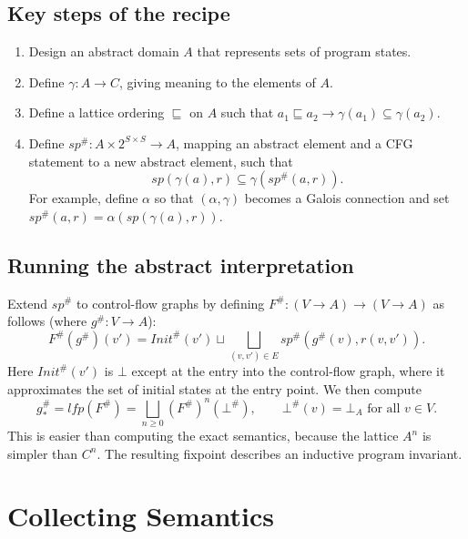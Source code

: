 \subsection*{Key steps of the recipe}
 
\begin{enumerate}
  \item Design an abstract domain $A$ that represents sets of program states.
  \item Define $\gamma : A \to C$, giving meaning to the elements of $A$.
  \item Define a lattice ordering $\sqsubseteq$ on $A$ such that $a_1 \sqsubseteq a_2 \rightarrow \gamma(a_1) \subseteq \gamma(a_2)$.
  \item Define $sp^\# : A \times 2^{S \times S} \to A$, mapping an abstract element and a CFG statement to a new abstract element, such that
  \[
  sp(\gamma(a), r) \subseteq \gamma(sp^\#(a, r)).
  \]
  For example, define $\alpha$ so that $(\alpha, \gamma)$ becomes a Galois connection and set $sp^\#(a, r) = \alpha(sp(\gamma(a), r))$.
\end{enumerate}
 
\subsection*{Running the abstract interpretation}
 
Extend $sp^\#$ to control-flow graphs by defining $F^\# : (V \to A) \to (V \to A)$ as follows (where $g^\# : V \to A$):
\[
F^\#(g^\#)(v') = \mathit{Init}^\#(v') \sqcup \bigsqcup_{(v, v') \in E} sp^\#(g^\#(v), r(v, v')).
\]
Here $\mathit{Init}^\#(v')$ is $\bot$ except at the entry into the control-flow graph, where it approximates the set of initial states at the entry point. We then compute
\[
g^\#_* = \mathit{lfp}(F^\#) = \bigsqcup_{n \ge 0} (F^\#)^n(\bot^\#), \qquad \bot^\#(v) = \bot_A \text{ for all } v \in V.
\]
This is easier than computing the exact semantics, because the lattice $A^n$ is simpler than $C^n$. The resulting fixpoint describes an inductive program invariant.
 
\section{Collecting Semantics}
 
 
